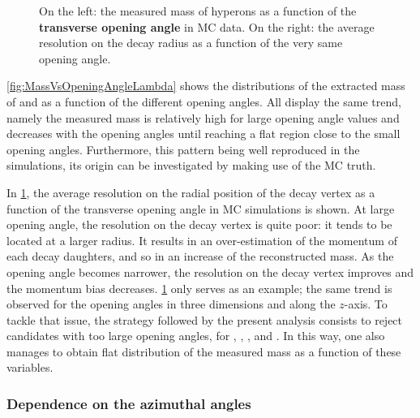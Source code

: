 \begin{figure}[h]
\hspace*{-2.cm}
\caption{On the left: the measured mass of \rmLambda hyperons as a function of the \textbf{transverse opening angle} in MC data. On the right: the average resolution on the decay radius as a function of the very same opening angle.}
	\label{fig:MassVsOpeningAngle}
\end{figure}

\Fig\ref{fig:MassVsOpeningAngleLambda} shows the distributions of the extracted mass of \rmLambda and \rmAlambda as a function of the different opening angles. All display the same trend, namely the measured mass is relatively high for large opening angle values and decreases with the opening angles until reaching a flat region close to the small opening angles. Furthermore, this pattern being well reproduced in the simulations, its origin can be investigated by making use of the MC truth. 

In \fig\ref{fig:MassVsOpeningAngle}, the average resolution on the radial position of the decay vertex as a function of the transverse opening angle in MC simulations is shown. At large opening angle, the resolution on the decay vertex is quite poor: it tends to be located at a larger radius. It results in an over-estimation of the momentum of each decay daughters, and so in an increase of the reconstructed mass. As the opening angle becomes narrower, the resolution on the decay vertex improves and the momentum bias decreases. \Fig\ref{fig:MassVsOpeningAngle} only serves as an example; the same trend is observed for the opening angles in three dimensions and along the $z$-axis. To tackle that issue, the strategy followed by the present analysis consists to reject candidates with too large opening angles, for \rmKzeroS, \rmLambda, \rmAlambda, \rmXiPM and \rmOmegaPM. In this way, one also manages to obtain flat distribution of the measured mass as a function of these variables.\\

\subsubsection{Dependence on the azimuthal angles}
\label{subsubsec:DependenceAzimuthalAngle}

